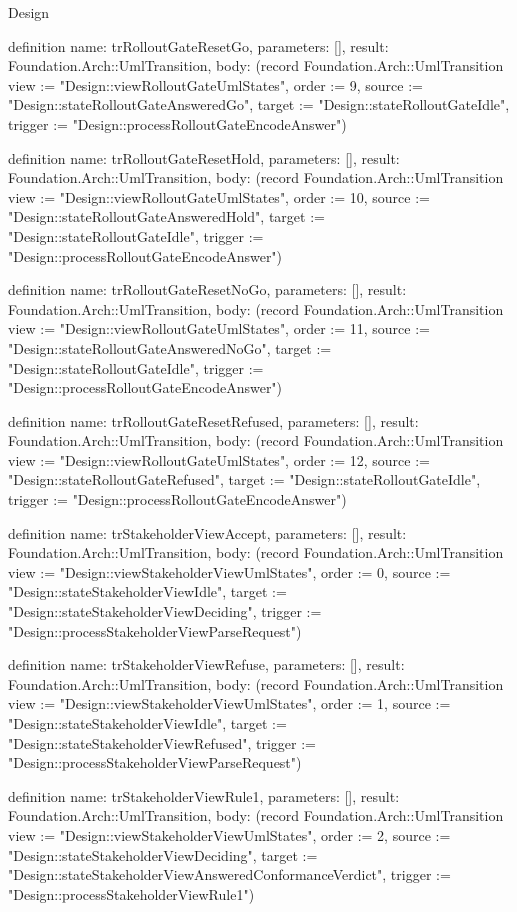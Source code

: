 \begin{lexlean}{Design}
\begin{semanticmodule}
definition{
  name: trRolloutGateResetGo,
  parameters: [],
  result: Foundation.Arch::UmlTransition,
  body: (record Foundation.Arch::UmlTransition {view := "Design::viewRolloutGateUmlStates", order := 9, source := "Design::stateRolloutGateAnsweredGo", target := "Design::stateRolloutGateIdle", trigger := "Design::processRolloutGateEncodeAnswer"})
}

definition{
  name: trRolloutGateResetHold,
  parameters: [],
  result: Foundation.Arch::UmlTransition,
  body: (record Foundation.Arch::UmlTransition {view := "Design::viewRolloutGateUmlStates", order := 10, source := "Design::stateRolloutGateAnsweredHold", target := "Design::stateRolloutGateIdle", trigger := "Design::processRolloutGateEncodeAnswer"})
}

definition{
  name: trRolloutGateResetNoGo,
  parameters: [],
  result: Foundation.Arch::UmlTransition,
  body: (record Foundation.Arch::UmlTransition {view := "Design::viewRolloutGateUmlStates", order := 11, source := "Design::stateRolloutGateAnsweredNoGo", target := "Design::stateRolloutGateIdle", trigger := "Design::processRolloutGateEncodeAnswer"})
}

definition{
  name: trRolloutGateResetRefused,
  parameters: [],
  result: Foundation.Arch::UmlTransition,
  body: (record Foundation.Arch::UmlTransition {view := "Design::viewRolloutGateUmlStates", order := 12, source := "Design::stateRolloutGateRefused", target := "Design::stateRolloutGateIdle", trigger := "Design::processRolloutGateEncodeAnswer"})
}

definition{
  name: trStakeholderViewAccept,
  parameters: [],
  result: Foundation.Arch::UmlTransition,
  body: (record Foundation.Arch::UmlTransition {view := "Design::viewStakeholderViewUmlStates", order := 0, source := "Design::stateStakeholderViewIdle", target := "Design::stateStakeholderViewDeciding", trigger := "Design::processStakeholderViewParseRequest"})
}

definition{
  name: trStakeholderViewRefuse,
  parameters: [],
  result: Foundation.Arch::UmlTransition,
  body: (record Foundation.Arch::UmlTransition {view := "Design::viewStakeholderViewUmlStates", order := 1, source := "Design::stateStakeholderViewIdle", target := "Design::stateStakeholderViewRefused", trigger := "Design::processStakeholderViewParseRequest"})
}

definition{
  name: trStakeholderViewRule1,
  parameters: [],
  result: Foundation.Arch::UmlTransition,
  body: (record Foundation.Arch::UmlTransition {view := "Design::viewStakeholderViewUmlStates", order := 2, source := "Design::stateStakeholderViewDeciding", target := "Design::stateStakeholderViewAnsweredConformanceVerdict", trigger := "Design::processStakeholderViewRule1"})
}


\end{semanticmodule}
\end{lexlean}
